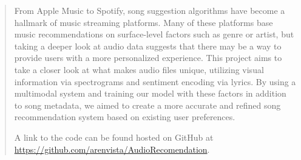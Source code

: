 \begin{abstract}
From Apple Music to Spotify, song suggestion algorithms have become a hallmark of music streaming platforms. Many of these platforms base music recommendations on surface-level factors such as genre or artist, but taking a deeper look at audio data suggests that there may be a way to provide users with a more personalized experience. This project aims to take a closer look at what makes audio files unique, utilizing visual information via spectrograms and sentiment encoding via lyrics. By using a multimodal system and training our model with these factors in addition to song metadata, we aimed to create a more accurate and refined song recommendation system based on existing user preferences.

A link to the code can be found hosted on GitHub at \href{https://github.com/arenvista/AudioRecomendation}{https://github.com/arenvista/AudioRecomendation}.
\end{abstract}